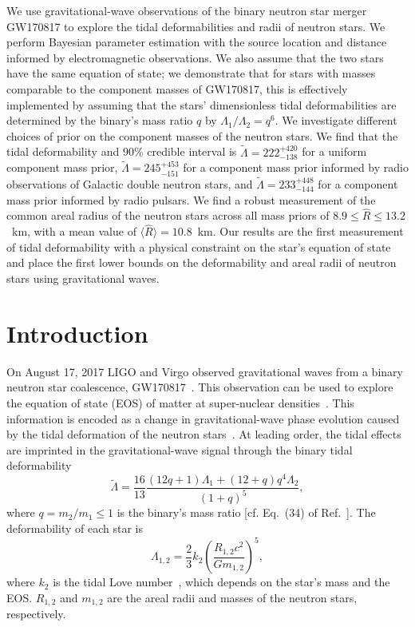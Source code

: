 We use gravitational-wave observations of the binary neutron star merger GW170817 to explore the tidal deformabilities and radii of neutron stars.
We perform Bayesian parameter estimation with the source location and distance informed by electromagnetic observations. We also assume that the two stars have the same equation of state; we demonstrate that for stars with masses comparable to the component masses of GW170817, this is effectively implemented by assuming that the stars' dimensionless tidal deformabilities are determined by the binary's mass ratio $q$ by $\Lambda_1/\Lambda_2 = q^6$. We investigate different choices of prior on the component masses of the neutron stars. We find that the tidal deformability and 90\% credible interval is $\tilde{\Lambda}=222^{+420}_{-138}$ for a uniform component mass prior, $\tilde{\Lambda}=245^{+453}_{-151}$ for a component mass prior informed by radio observations of Galactic double neutron stars, and $\tilde{\Lambda}=233^{+448}_{-144}$ for a component mass prior informed by radio pulsars. We find a robust measurement of the common areal radius of the neutron stars across all mass priors of $8.9 \le \hat{R} \le 13.2$~km, with a mean value of $\langle \hat{R} \rangle = 10.8$~km. Our results are the first measurement of tidal deformability with a physical constraint on the star's equation of state and place the first lower bounds on the deformability and areal radii of neutron stars using gravitational waves.

\section{Introduction}

On August 17, 2017 LIGO and Virgo observed gravitational waves from a binary neutron star coalescence, GW170817~\cite{TheLIGOScientific:2017qsa}.
This observation can be used to explore the equation of state (EOS) of matter at super-nuclear densities~\cite{thorne.k:1987,Read:2009yp}. This information is encoded as a change in gravitational-wave phase evolution caused by the tidal deformation of the  neutron stars~\cite{Flanagan:2007ix}. 
At leading order, the tidal effects are imprinted in the gravitational-wave signal through the binary tidal deformability~\cite{Flanagan:2007ix,Hinderer:2007mb}
\begin{equation}
\tilde{\Lambda}
= \frac{16}{13}\frac{(12q+1)\Lambda_1+(12+q)q^4\Lambda_2}{(1+q)^5}, \label{eq:lambda_t0}
\end{equation}
where $q = m_2/m_1 \leq 1$ is the binary's mass ratio [cf. Eq.~(34) of Ref.~\cite{Gralla:2017djj}]. The deformability of each star is
\begin{equation}
\Lambda_{1,2}=\frac{2}{3}k_2\left(\frac{R_{1,2}c^2}{Gm_{1,2}}\right)^5, \label{eq:lambda_12}
\end{equation}
where $k_2$ is the tidal Love number~\cite{Flanagan:2007ix,Hinderer:2007mb}, which depends on the star's mass and the EOS. $R_{1,2}$ and $m_{1,2}$ are the areal radii and masses of the neutron stars, respectively. 

